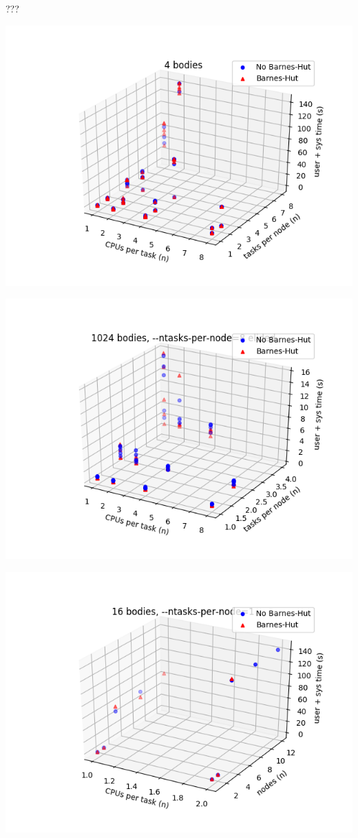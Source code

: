\documentclass{beamer}
\begin{document}
\begin{frame}[allowframebreaks]{???}
\framebreak

\includegraphics[width=\linewidth]{4-cpusPerTask-tasksPerNode}

\framebreak

\includegraphics[width=\linewidth]{1024-cpusPerTask-tasksPerNode-elide_8_tpn}

\framebreak

\includegraphics[width=\linewidth]{16-cpusPerTask-nodes-just_1_tpn}


\end{frame}
\end{document}
